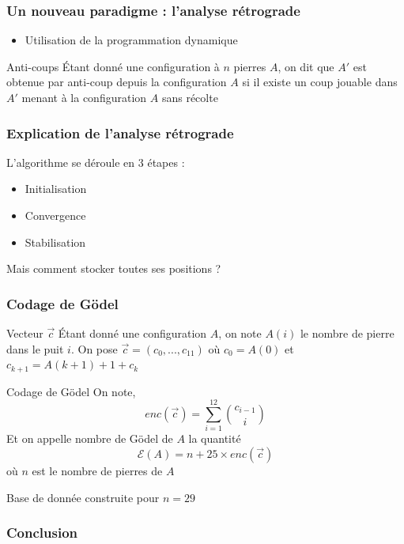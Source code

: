 \message{ !name(test.tex)}\documentclass{beamer}
\begin{document}
\begin{frame}
  \frametitle{Un nouveau paradigme : l'analyse rétrograde}
  \begin{itemize}
  \item Utilisation de la programmation dynamique
  \end{itemize}
  \begin{block}{Anti-coups}
    Étant donné une configuration à $n$ pierres $A$, on dit que $A'$ est obtenue par anti-coup depuis la configuration $A$ si il existe un coup jouable dans $A'$ menant à la configuration $A$ sans récolte
  \end{block}
\end{frame}

\begin{frame}
  \frametitle{Explication de l'analyse rétrograde}
  L'algorithme se déroule en 3 étapes :
  \begin{itemize}
  \item Initialisation
  \item Convergence
  \item Stabilisation
  \end{itemize}
  Mais comment stocker toutes ses positions ?
\end{frame}

\begin{frame}
  \frametitle{Codage de Gödel}
  \begin{block}{Vecteur $\vec c$}
    Étant donné une configuration $A$, on note $A(i)$ le nombre de pierre dans le puit $i$. On pose $\vec c = (c_0, ..., c_{11})$ où $c_0 = A(0)$ et $c_{k+1}=A(k+1) + 1 + c_k$
  \end{block}
  \begin{block}{Codage de Gödel }
    On note, $$enc(\vec c) = \sum_{i=1}^{12} \binom {c_{i-1}} {i}$$
    Et on appelle nombre de Gödel de $A$ la quantité
    $$\mathcal E(A) = n + 25 \times enc(\vec c)$$ où $n$ est le nombre de pierres de $A$
  \end{block}
  Base de donnée construite pour $n = 29$
\end{frame}

\begin{frame}
  \frametitle{Conclusion}
\end{frame}
  
\end{document}
